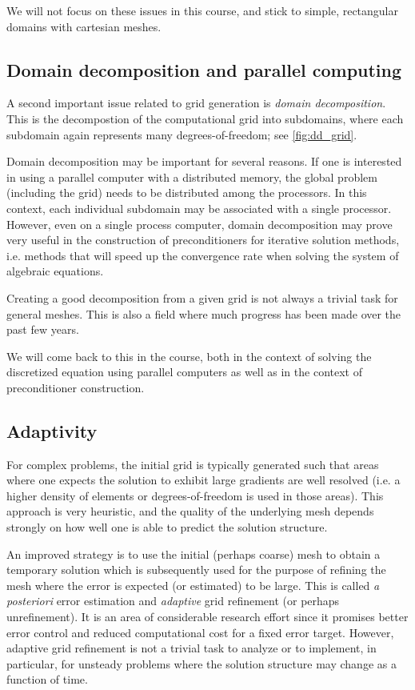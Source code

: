We will not focus on these issues in this course, and stick to simple,
rectangular domains with cartesian meshes.

\subsection{Domain decomposition and parallel computing}

A second important issue related to grid generation is \emph{domain
decomposition}. This is the decompostion of the computational grid into
subdomains, where each subdomain again represents many degrees-of-freedom; see
\autoref{fig:dd_grid}.

Domain decomposition may be important for several reasons. If one is interested
in using a parallel computer with a distributed memory, the global problem
(including the grid) needs to be distributed among the processors. In this
context, each individual subdomain may be associated with a single processor.
However, even on a single process computer, domain decomposition may prove very
useful in the construction of preconditioners for iterative solution methods,
i.e. methods that will speed up the convergence rate when solving the system of
algebraic equations.

Creating a good decomposition from a given grid is not always a trivial task for
general meshes. This is also a field where much progress has been made over the
past few years.

We will come back to this in the course, both in the context of solving the
discretized equation using parallel computers as well as in the context of
preconditioner construction.

\subsection{Adaptivity}

For complex problems, the initial grid is typically generated such that areas
where one expects the solution to exhibit large gradients are well resolved
(i.e. a higher density of elements or degrees-of-freedom is used in those
areas). This approach is very heuristic, and the quality of the underlying mesh
depends strongly on how well one is able to predict the solution structure.

An improved strategy is to use the initial (perhaps coarse) mesh to obtain a
temporary solution which is subsequently used for the purpose of refining the
mesh where the error is expected (or estimated) to be large. This is called
\emph{a posteriori} error estimation and \emph{adaptive} grid refinement (or
perhaps unrefinement). It is an area of considerable research effort since it
promises better error control and reduced computational cost for a fixed error
target. However, adaptive grid refinement is not a trivial task to analyze or to
implement, in particular, for unsteady problems where the solution structure may
change as a function of time.

